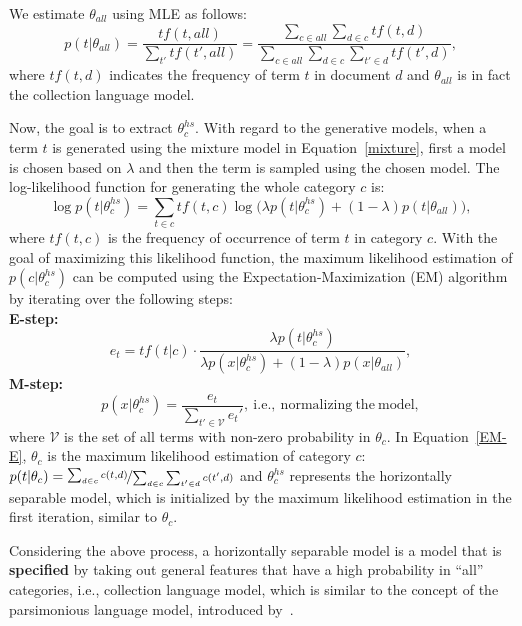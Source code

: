 We estimate $\theta_{all}$ using MLE as follows:
\begin{equation}
p(t|\theta_{all}) = \frac{tf(t,all)}{\sum_{t'} tf(t',all)} = \frac{\sum_{c \in all}{\sum_{d \in c}{tf(t,d)}}}{{\sum_{c \in all}{\sum_{d \in c}{\sum_{t' \in d}{tf(t',d)}}}}},
\label{eq:cmodel}
\end{equation}
where $tf(t,d)$ indicates the frequency of term $t$ in document $d$ and $\theta_{all}$ is in fact the collection language model. 

Now, the goal is to extract $\theta_{c}^{hs}$. With regard to the generative models, when a term $t$ is generated using the mixture model in Equation~\ref{mixture}, first a model is chosen based on $\lambda$ and then the term is sampled using the chosen model.  The log-likelihood function for generating the whole category $c$ is:
\begin{equation}
\log p(t|\theta_{c}^{hs}) = \sum_{t \in c} tf(t,c) \log \big(\lambda p(t|\theta_{c}^{hs}) + (1-\lambda) p(t|\theta_{all})\big),
\end{equation}
where $tf(t,c)$ is the frequency of occurrence of term $t$ in category $c$. 
With the goal of maximizing this likelihood function, the maximum likelihood estimation of $p(c|\theta_{c}^{hs})$ can be computed using the Expectation-Maximization (EM) algorithm by iterating over the following steps:
\\
\textbf{E-step:}
\begin{equation}
e_t = tf(t|c)\cdot \frac{\lambda p(t|\theta_{c}^{hs})}{\lambda p(x|\theta_{c}^{hs}) + (1-\lambda) p(x|\theta_{all})}
\label{EM-E},
\end{equation}
\textbf{M-step:}
\begin{equation}
p(x|\theta_{c}^{hs}) = \frac{e_t}{\sum_{t' \in \mathcal{V}} e_t'}, \mathrm{~i.e.,~normalizing~the~model},
\label{EM-M}
\end{equation}
where $\mathcal{V}$ is the set of all terms with non-zero probability in $\theta_c$. In Equation~\ref{EM-E}, $\theta_c$ is the maximum likelihood estimation of category $c$: $p(t|\theta_{c}) = \nicefrac{\sum_{d \in c}c(t,d)}{\sum_{d \in c}{\sum_{t' \in d} c(t',d)}}$ and $\theta_{c}^{hs}$ represents the horizontally separable model, which is initialized by the maximum likelihood estimation in the first iteration, similar to $\theta_c$. 

Considering the above process, a horizontally separable model is a model that is \textbf{specified} by taking out general features that have a high probability in ``all'' categories, i.e., collection language model, which is similar to the concept of the parsimonious language model, introduced by~\citet{Hiemstra:2004}.

